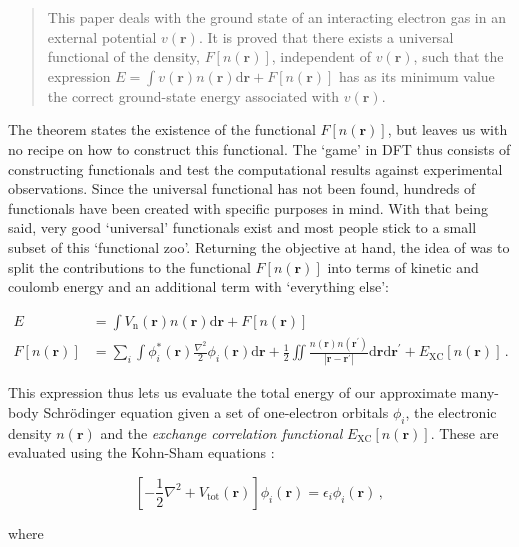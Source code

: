 \begin{quote}
	This paper deals with the ground state of an interacting electron gas in an external potential $v(\bm{r})$. It is proved that there exists a universal functional of the density, $F[n(\bm{r})]$, independent of $v(\bm{r})$, such that the expression $E= \int v(\bm{r}) n(\bm{r}) \mathrm{d}\bm{r} + F[n(\bm{r})]$ has as its minimum value the correct ground-state energy associated with $v(\bm{r})$.
\end{quote}

\noindent The theorem states the existence of the functional $F[n(\bm{r})]$, but leaves us with no recipe on how to construct this functional. The `game' in DFT thus consists of constructing functionals and test the computational results against experimental observations. Since the universal functional has not been found, hundreds of functionals \cite{Mardirossian2017} have been created with specific purposes in mind. With that being said, very good `universal' functionals exist and most people stick to a small subset of this `functional zoo'. Returning the objective at hand, the idea of \citeauthor{Kohn1965} \cite{Kohn1965} was to split the contributions to the functional $F[n(\bm{r})]$ into terms of kinetic and coulomb energy and an additional term with `everything else':

\begin{align}
	E &= \int V_\text{n}(\bm{r}) n(\bm{r}) \mathrm{d}\bm{r} + F[n(\bm{r})] \label{eq:ks_toten1} \\
	F[n(\bm{r})] &= \sum_i \int \phi_i^*(\bm{r})\frac{\nabla^2}{2}\phi_i(\bm{r}) \mathrm{d}\bm{r} + \frac{1}{2} \iint \frac{n(\bm{r})n(\bm{r}^\prime)}{|\bm{r}-\bm{r}^\prime|} \mathrm{d}\bm{r} \mathrm{d}\bm{r}^\prime + E_\text{XC}[n(\bm{r})] \, . \label{eq:ks_toten2}
\end{align}

\noindent This expression thus lets us evaluate the total energy of our approximate many-body Schr\"odinger equation given a set of one-electron orbitals $\phi_i$, the electronic density $n(\bm{r})$ and the \emph{exchange correlation functional} $E_\text{XC}[n(\bm{r})]$. These are evaluated using the Kohn-Sham equations \cite{Kohn1965}:

\begin{equation}\label{eq:kohn_sham}
\left[ -\frac{1}{2} \nabla^2 + V_\text{tot}(\bm{r}) \right] \phi_i(\bm{r}) = \epsilon_i \phi_i(\bm{r}) \, ,
\end{equation}

\noindent where

